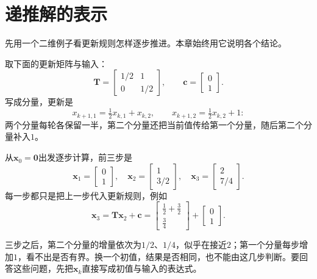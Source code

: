 \section{递推解的表示}
\label{sec:ls-affine-iteration-unrolling}

先用一个二维例子看更新规则怎样逐步推进。本章始终用它说明各个结论。
\begin{example}[贯穿本章的更新]
\label{ex:ls-affine-running-example}
取下面的更新矩阵与输入：
\[
 \bm T=\begin{bmatrix}1/2&1\\0&1/2\end{bmatrix},\qquad
 \bm c=\begin{bmatrix}0\\1\end{bmatrix}.
\]
写成分量，更新是
\[
 x_{k+1,1}=\tfrac12x_{k,1}+x_{k,2},\qquad
 x_{k+1,2}=\tfrac12x_{k,2}+1 :
\]
两个分量每轮各保留一半，第二个分量还把当前值传给第一个分量，随后第二个分量补入$1$。

从$\bm x_0=\bm0$出发逐步计算，前三步是
\[
 \bm x_1=\begin{bmatrix}0\\1\end{bmatrix},\quad
 \bm x_2=\begin{bmatrix}1\\3/2\end{bmatrix},\quad
 \bm x_3=\begin{bmatrix}2\\7/4\end{bmatrix}.
\]
每一步都只是把上一步代入更新规则，例如
\[
 \bm x_3=\bm T\bm x_2+\bm c=\begin{bmatrix}\tfrac12+\tfrac32\\\tfrac34\end{bmatrix}+\begin{bmatrix}0\\1\end{bmatrix}.
\]
\end{example}
三步之后，第二个分量的增量依次为$1/2$、$1/4$，似乎在接近$2$；第一个分量每步增加$1$，看不出是否有界。换一个初值，结果是否相同，也不能由这几步判断。要回答这些问题，先把$\bm x_k$直接写成初值与输入的表达式。

